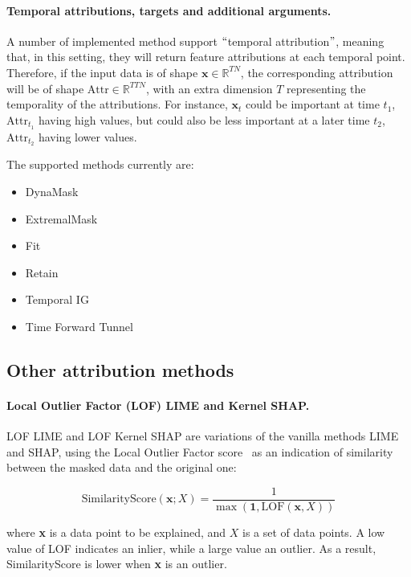 \paragraph{Temporal attributions, targets and additional arguments.}

A number of implemented method support $``$temporal attribution$"$, meaning that, in this setting, they will return
feature attributions at each temporal point.
Therefore, if the input data is of shape $\textbf{x} \in \mathbb{R}^{TN}$, the corresponding attribution will be of
shape $\textrm{Attr} \in \mathbb{R}^{TTN}$, with an extra dimension $T$ representing the temporality of the attributions.
For instance, $\textbf{x}_t$ could be important at time $t_1$, $\textrm{Attr}_{t_1}$ having high values, but could also
be less important at a later time $t_2$, $\textrm{Attr}_{t_2}$ having lower values.

\newpage

The supported methods currently are:

\begin{itemize}
    \item DynaMask
    \item ExtremalMask
    \item Fit
    \item Retain
    \item Temporal IG
    \item Time Forward Tunnel
\end{itemize}


\subsection{Other attribution methods}
\label{subsec:other-attribution-methods}

\paragraph{Local Outlier Factor (LOF) LIME and Kernel SHAP\@.}

LOF LIME and LOF Kernel SHAP are variations of the vanilla methods LIME and SHAP, using the Local Outlier Factor
score~\citep{breunig2000lof} as an indication of similarity between the masked data and the original one:

\[ \textrm{SimilarityScore}(\textbf{x}; X) = \frac{1}{\max(\textbf{1}, \textrm{LOF}(\textbf{x}, X))} \]

where \textbf{x} is a data point to be explained, and $X$ is a set of data points.
A low value of LOF indicates an inlier, while a large value an outlier.
As a result, SimilarityScore is lower when \textbf{x} is an outlier.

